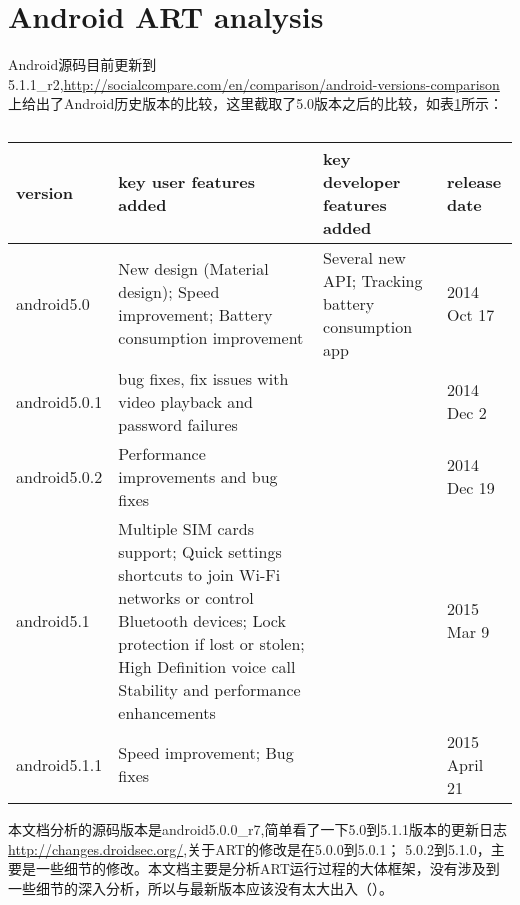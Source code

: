 \section{Android ART analysis}
Android源码目前更新到5.1.1\_r2,\url{http://socialcompare.com/en/comparison/android-versions-comparison}
上给出了Android历史版本的比较，这里截取了5.0版本之后的比较，如表\ref{androidcompare}所示：
\begin{table}[H]
\caption{\label{androidcompare}}
\begin{tabular}{|p{2cm}|p{5cm}|p{3.5cm}|p{2.5cm}|}
\hline
version & key user features added & key developer features added & release date\\
\hline
android5.0 & New design (Material design); 
Speed improvement; 
Battery consumption improvement 
& Several new API; 
Tracking battery consumption app & 2014 Oct 17\\
\hline
android5.0.1 & bug fixes, fix issues with video playback and password failures & & 2014 Dec 2\\
\hline
android5.0.2 & Performance improvements and bug fixes & & 2014 Dec 19\\
\hline
android5.1 & Multiple SIM cards support;
Quick settings shortcuts to join Wi-Fi networks or control Bluetooth devices;
Lock protection if lost or stolen;
High Definition voice call
Stability and performance enhancements & & 2015 Mar 9\\
\hline
android5.1.1 & Speed improvement;
Bug fixes & & 2015 April 21\\
\hline
\end{tabular}
\end{table}

本文档分析的源码版本是android5.0.0\_r7,简单看了一下5.0到5.1.1版本的更新日志
\url{http://changes.droidsec.org/},关于ART的修改是在5.0.0到5.0.1；
5.0.2到5.1.0，主要是一些细节的修改。本文档主要是分析ART运行过程的大体框架，没有涉及到
一些细节的深入分析，所以与最新版本应该没有太大出入（）。

